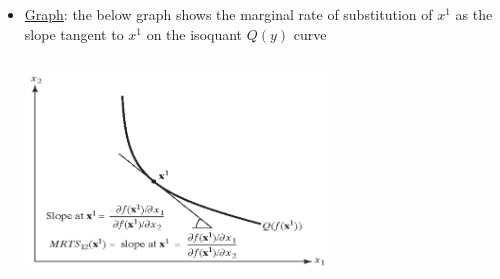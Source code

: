 \documentclass{article}
\begin{document}
  \begin{itemize}
    \item  \underline{Graph}: the below graph shows the marginal rate of substitution of $x^{1}$ as the slope tangent to $x^{1}$ on the isoquant $Q(y)$ curve \\
    \begin{center}
      \includegraphics[width=8cm, height=6cm]{pic28}
    \end{center}
  \end{itemize}
\vspace{6mm}
\end{document}

